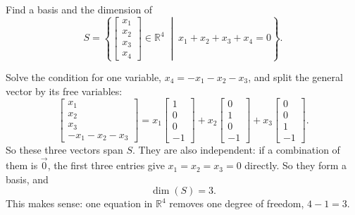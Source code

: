 \begin{example}
Find a basis and the dimension of
\[
S = \left\{ \begin{bmatrix} x_1 \\ x_2 \\ x_3 \\ x_4 \end{bmatrix} \in \mathbb{R}^4 \;\middle|\; x_1 + x_2 + x_3 + x_4 = 0 \right\}.
\]

\begin{solution}
Solve the condition for one variable, $x_4 = -x_1 - x_2 - x_3$, and split the general vector by its free variables:
\[
\begin{bmatrix} x_1 \\ x_2 \\ x_3 \\ -x_1 - x_2 - x_3 \end{bmatrix}
= x_1 \begin{bmatrix} 1 \\ 0 \\ 0 \\ -1 \end{bmatrix}
+ x_2 \begin{bmatrix} 0 \\ 1 \\ 0 \\ -1 \end{bmatrix}
+ x_3 \begin{bmatrix} 0 \\ 0 \\ 1 \\ -1 \end{bmatrix}.
\]
So these three vectors span $S$. They are also independent: if a combination of them is $\vec{0}$, the first three entries give $x_1 = x_2 = x_3 = 0$ directly. So they form a basis, and
\[
\dim(S) = 3.
\]
This makes sense: one equation in $\mathbb{R}^4$ removes one degree of freedom, $4 - 1 = 3$.
\end{solution}
\end{example}

